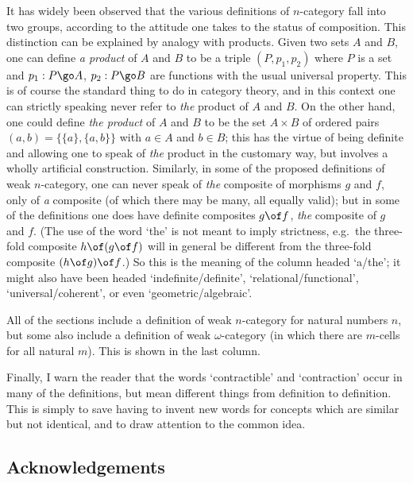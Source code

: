 It has widely been observed that the various definitions of $n$-category fall
into two groups, according to the attitude one takes to the status of
composition.  This distinction can be explained by analogy with products.
Given two sets $A$ and $B$, one can define \emph{a product} of $A$ and $B$ to
be a triple $(P,p_1,p_2)$ where $P$ is a set and $p_1: P \go A$, $p_2: P \go
B$ are functions with the usual universal property.  This is of course the
standard thing to do in category theory, and in this context one can strictly
speaking never refer to \emph{the} product of $A$ and $B$.  On the other
hand, one could define \emph{the product} of $A$ and $B$ to be the set
$A\times B$ of ordered pairs $(a,b) = \{ \{a\}, \{a,b\} \}$ with $a\in A$ and
$b\in B$; this has the virtue of being definite and allowing one to speak of
\emph{the} product in the customary way, but involves a wholly artificial
construction.  Similarly, in some of the proposed definitions of weak
$n$-category, one can never speak of \emph{the} composite of morphisms $g$
and $f$, only of \emph{a} composite (of which there may be many, all equally
valid); but in some of the definitions one does have definite composites
$g\of f$, \emph{the} composite of $g$ and $f$.  (The use of the word `the' is
not meant to imply strictness, e.g.\ the three-fold composite $h\of (g\of f)$
will in general be different from the three-fold composite $(h\of g) \of f$.)
So this is the meaning of the column headed `a/the'; it might also have been
headed `indefinite/definite', `relational/functional', `universal/coherent',
or even `geometric/algebraic'.

All of the sections include a definition of weak $n$-category for
natural numbers $n$, but some also include a definition of weak
$\omega$-category (in which there are $m$-cells for all natural $m$).  This
is shown in the last column.

Finally, I warn the reader that the words `contractible' and `contraction'
occur in many of the definitions, but mean different things from
definition to definition.  This is simply to save having to invent new words
for concepts which are similar but not identical, and to draw attention to
the common idea.  










\subsection*{Acknowledgements}

